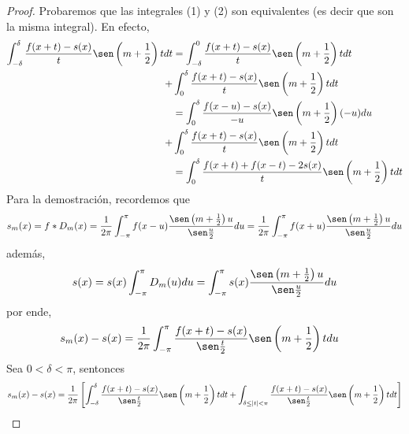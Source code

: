 \documentclass[12pt]{report}
\theoremstyle{largebreak}
\begin{document}
    \begin{proof}
        Probaremos que las integrales (1) y (2) son equivalentes (es decir que son la misma integral). En efecto,
        \begin{equation*}
            \begin{split}
                \int_{-\delta}^\delta \frac{f(x+t)-s(x)}{t}\sen\left(m+\frac{1}{2} \right)tdt&=\int_{-\delta}^0\frac{f(x+t)-s(x)}{t}\sen\left(m+\frac{1}{2} \right)tdt\\
                +&\int_0^\delta \frac{f(x+t)-s(x)}{t}\sen\left(m+\frac{1}{2} \right)tdt\\
                &=\int_0^\delta \frac{f(x-u)-s(x)}{-u}\sen\left(m+\frac{1}{2} \right)(-u)du\\
                +&\int_0^\delta \frac{f(x+t)-s(x)}{t}\sen\left(m+\frac{1}{2} \right)tdt\\
                &=\int_0^\delta\frac{f(x+t)+f(x-t)-2s(x)}{t}\sen\left( m+\frac{1}{2}\right)tdt\\
            \end{split}
        \end{equation*}
        Para la demostración, recordemos que
        \begin{equation*}
            s_m(x)=f*D_m(x)=\frac{1}{2\pi}\int_{-\pi}^{\pi}f(x-u)\frac{\sen\left(m+\frac{1}{2} \right)u}{\sen\frac{u}{2}}du=\frac{1}{2\pi}\int_{-\pi}^{\pi}f(x+u)\frac{\sen\left(m+\frac{1}{2} \right)u}{\sen\frac{u}{2}}du
        \end{equation*}
        además,
        \begin{equation*}
            s(x)=s(x)\int_{-\pi}^\pi D_m(u)du=\int_{-\pi}^{\pi}s(x)\frac{\sen\left(m+\frac{1}{2} \right)u}{\sen\frac{u}{2}}du
        \end{equation*}
        por ende,
        \begin{equation*}
            \begin{split}
                s_m(x)-s(x)&=\frac{1}{2\pi}\int_{-\pi}^{\pi}\frac{f(x+t)-s(x)}{\sen\frac{t}{2}}\sen\left(m+\frac{1}{2} \right)tdu
            \end{split}
        \end{equation*}
        Sea $0<\delta<\pi$, sentonces
        \begin{equation*}
            \begin{split}
                s_m(x)-s(x)&=\frac{1}{2\pi}\left[\int_{-\delta}^{\delta}\frac{f(x+t)-s(x)}{\sen\frac{t}{2}}\sen\left(m+\frac{1}{2} \right)tdt+\int_{\delta\leq|t|<\pi}\frac{f(x+t)-s(x)}{\sen\frac{t}{2}}\sen\left(m+\frac{1}{2} \right)tdt\right] \\

\end{split}
\end{equation*}
\end{proof}
\end{document}
